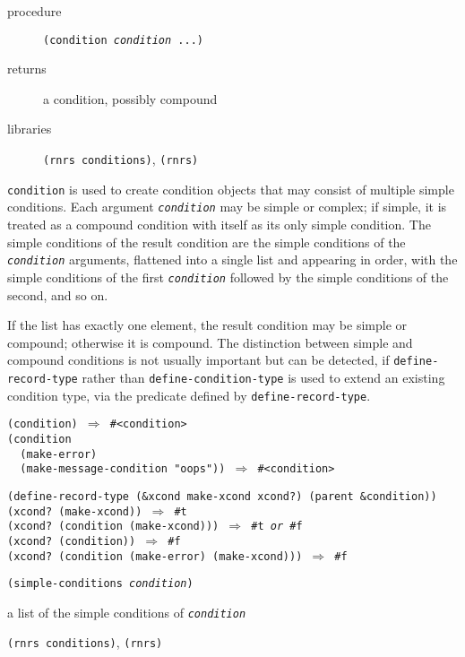 \begin{description}

\label{exceptions_s15}\item[procedure] \texttt{(condition \textit{condition} ...)}



\item[returns] a condition, possibly compound


\item[libraries] \texttt{(rnrs conditions)}, \texttt{(rnrs)}
\end{description}

\texttt{condition} is used to create condition objects that may consist
of multiple simple conditions.
Each argument \texttt{\textit{condition}} may be simple or complex; if simple, it is
treated as a compound condition with itself as its only simple condition.
The simple conditions of the result condition are the simple conditions of
the \texttt{\textit{condition}} arguments, flattened into a single list and appearing
in order, with the simple conditions of the first \texttt{\textit{condition}} followed
by the simple conditions of the second, and so on.

If the list has exactly one element, the result condition may be simple or
compound; otherwise it is compound.
The distinction between simple and compound conditions is not usually
important but can be detected, if \texttt{define-record-type} rather
than \texttt{define-condition-type} is used to extend an existing
condition type, via the predicate defined by \texttt{define-record-type}.


\begin{alltt}
(condition) \(\Rightarrow\) \#{}\textless{}condition\textgreater{}
(condition
  (make-error)
  (make-message-condition "oops")) \(\Rightarrow\) \#{}\textless{}condition\textgreater{}

(define-record-type (\&{}xcond make-xcond xcond?) (parent \&{}condition))
(xcond? (make-xcond)) \(\Rightarrow\) \#{}t
(xcond? (condition (make-xcond))) \(\Rightarrow\) \#{}t \textit{or} \#{}f
(xcond? (condition)) \(\Rightarrow\) \#{}f
(xcond? (condition (make-error) (make-xcond))) \(\Rightarrow\) \#{}f
\end{alltt}

\begin{description}

\label{exceptions_s16}\item[procedure] \texttt{(simple-conditions \textit{condition})}



\item[returns] a list of the simple conditions of \texttt{\textit{condition}}


\item[libraries] \texttt{(rnrs conditions)}, \texttt{(rnrs)}
\end{description}


